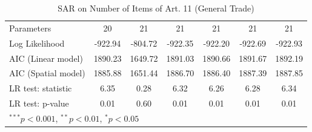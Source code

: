 \begin{table}[!h]
\begin{center}
\begin{tabular}{l c c c c c c }
Parameters              & 20           & 21           & 21           & 21           & 21           & 21           \\
Log Likelihood          & -922.94      & -804.72      & -922.35      & -922.20      & -922.69      & -922.93      \\
AIC (Linear model)      & 1890.23      & 1649.72      & 1891.03      & 1890.66      & 1891.67      & 1892.19      \\
AIC (Spatial model)     & 1885.88      & 1651.44      & 1886.70      & 1886.40      & 1887.39      & 1887.85      \\
LR test: statistic      & 6.35         & 0.28         & 6.32         & 6.26         & 6.28         & 6.34         \\
LR test: p-value        & 0.01         & 0.60         & 0.01         & 0.01         & 0.01         & 0.01         \\
\bottomrule
\multicolumn{7}{l}{\scriptsize{$^{***}p<0.001$, $^{**}p<0.01$, $^*p<0.05$}}
\end{tabular}
\caption{SAR on Number of Items of Art. 11 (General Trade)}
\label{table:coefficients}
\end{center}
\end{table}
